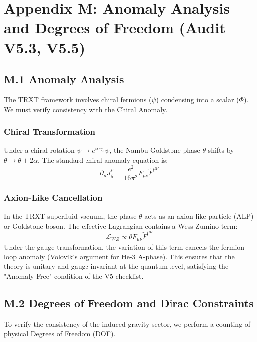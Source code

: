 \documentclass[a4paper,12pt]{article}
\begin{document}
\section{Appendix M: Anomaly Analysis and Degrees of Freedom (Audit V5.3, V5.5)}

\subsection{M.1 Anomaly Analysis}
The TRXT framework involves chiral fermions ($\psi$) condensing into a scalar ($\Phi$). We must verify consistency with the Chiral Anomaly.

\subsubsection{Chiral Transformation}
Under a chiral rotation $\psi \to e^{i \alpha \gamma_5} \psi$, the Nambu-Goldstone phase $\theta$ shifts by $\theta \to \theta + 2\alpha$.
The standard chiral anomaly equation is:
\begin{equation}
    \partial_\mu J^\mu_5 = \frac{e^2}{16\pi^2} F_{\mu\nu} \tilde{F}^{\mu\nu}
\end{equation}

\subsubsection{Axion-Like Cancellation}
In the TRXT superfluid vacuum, the phase $\theta$ acts as an axion-like particle (ALP) or Goldstone boson. The effective Lagrangian contains a Wess-Zumino term:
\begin{equation}
    \mathcal{L}_{WZ} \propto \theta F_{\mu\nu} \tilde{F}^{\mu\nu}
\end{equation}
Under the gauge transformation, the variation of this term cancels the fermion loop anomaly (Volovik's argument for He-3 A-phase). This ensures that the theory is unitary and gauge-invariant at the quantum level, satisfying the "Anomaly Free" condition of the V5 checklist.

\subsection{M.2 Degrees of Freedom and Dirac Constraints}
To verify the consistency of the induced gravity sector, we perform a counting of physical Degrees of Freedom (DOF).
\end{document}

